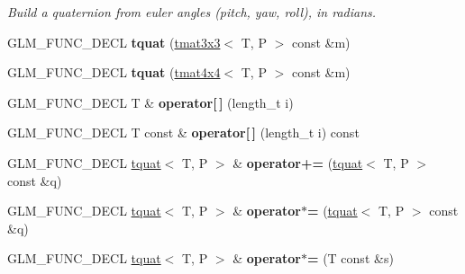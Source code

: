 \begin{DoxyCompactItemize}
\begin{DoxyCompactList}\small\item\em Build a quaternion from euler angles (pitch, yaw, roll), in radians. \end{DoxyCompactList}\item 
\hypertarget{structglm_1_1detail_1_1tquat_a84d40b0f5ab95f1e5ce01596c909fa25}{G\-L\-M\-\_\-\-F\-U\-N\-C\-\_\-\-D\-E\-C\-L {\bfseries tquat} (\hyperlink{structglm_1_1detail_1_1tmat3x3}{tmat3x3}$<$ T, P $>$ const \&m)}\label{structglm_1_1detail_1_1tquat_a84d40b0f5ab95f1e5ce01596c909fa25}

\item 
\hypertarget{structglm_1_1detail_1_1tquat_ad880a08dccbc297944a24204640c516d}{G\-L\-M\-\_\-\-F\-U\-N\-C\-\_\-\-D\-E\-C\-L {\bfseries tquat} (\hyperlink{structglm_1_1detail_1_1tmat4x4}{tmat4x4}$<$ T, P $>$ const \&m)}\label{structglm_1_1detail_1_1tquat_ad880a08dccbc297944a24204640c516d}

\item 
\hypertarget{structglm_1_1detail_1_1tquat_ad4f23768ca2296f8e0f140a5f03cd404}{G\-L\-M\-\_\-\-F\-U\-N\-C\-\_\-\-D\-E\-C\-L T \& {\bfseries operator\mbox{[}$\,$\mbox{]}} (length\-\_\-t i)}\label{structglm_1_1detail_1_1tquat_ad4f23768ca2296f8e0f140a5f03cd404}

\item 
\hypertarget{structglm_1_1detail_1_1tquat_aa5925e3eb8482a6c64881bfa6ca5e259}{G\-L\-M\-\_\-\-F\-U\-N\-C\-\_\-\-D\-E\-C\-L T const \& {\bfseries operator\mbox{[}$\,$\mbox{]}} (length\-\_\-t i) const }\label{structglm_1_1detail_1_1tquat_aa5925e3eb8482a6c64881bfa6ca5e259}

\item 
\hypertarget{structglm_1_1detail_1_1tquat_af711fbfb41fee281c93d990afa15f01e}{G\-L\-M\-\_\-\-F\-U\-N\-C\-\_\-\-D\-E\-C\-L \hyperlink{structglm_1_1detail_1_1tquat}{tquat}$<$ T, P $>$ \& {\bfseries operator+=} (\hyperlink{structglm_1_1detail_1_1tquat}{tquat}$<$ T, P $>$ const \&q)}\label{structglm_1_1detail_1_1tquat_af711fbfb41fee281c93d990afa15f01e}

\item 
\hypertarget{structglm_1_1detail_1_1tquat_a243cc89ef80ff3d0a9fd85fc3038587e}{G\-L\-M\-\_\-\-F\-U\-N\-C\-\_\-\-D\-E\-C\-L \hyperlink{structglm_1_1detail_1_1tquat}{tquat}$<$ T, P $>$ \& {\bfseries operator$\ast$=} (\hyperlink{structglm_1_1detail_1_1tquat}{tquat}$<$ T, P $>$ const \&q)}\label{structglm_1_1detail_1_1tquat_a243cc89ef80ff3d0a9fd85fc3038587e}

\item 
\hypertarget{structglm_1_1detail_1_1tquat_a65a23d874bc35ecade85c50bf5425a90}{G\-L\-M\-\_\-\-F\-U\-N\-C\-\_\-\-D\-E\-C\-L \hyperlink{structglm_1_1detail_1_1tquat}{tquat}$<$ T, P $>$ \& {\bfseries operator$\ast$=} (T const \&s)}\label{structglm_1_1detail_1_1tquat_a65a23d874bc35ecade85c50bf5425a90}


\end{DoxyCompactItemize}
